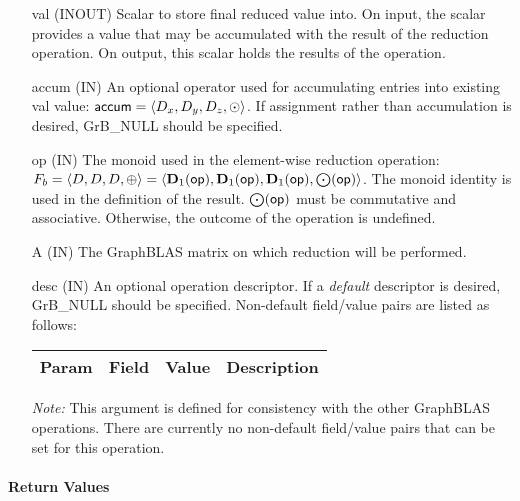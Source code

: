 \begin{itemize}[leftmargin=1.1in]
    \item[{\sf val}]    ({\sf INOUT}) Scalar to store final reduced value into. On input,
    the scalar provides a value that may be accumulated with the result of the
    reduction operation.  On output, this scalar holds the results of the
    operation.

    \item[{\sf accum}]    ({\sf IN}) An optional operator used for accumulating
    entries into existing {\sf val} value: ${\sf accum} = \langle D_x,
    D_y, D_z,\odot \rangle$. If assignment rather than accumulation is
    desired, {\sf GrB\_NULL} should be specified.

    \item[{\sf op}]    ({\sf IN}) The monoid 
    used in the element-wise reduction operation:
    $F_b=\langle D,D,D,\oplus \rangle = \langle \bold{D}_1({\sf op}), \bold{D}_1({\sf op}),
    \bold{D}_1({\sf op}),\bold{\bigodot}({\sf op})\rangle$.
    The monoid identity is used in the definition of the result.
    $\bold{\bigodot}({\sf op})$ must be commutative and associative. Otherwise, the outcome of the operation is undefined.
    
    \item[{\sf A}]     ({\sf IN}) The GraphBLAS matrix on which
	    reduction will be performed.

    \item[{\sf desc}] ({\sf IN}) An optional operation descriptor. If
    a \emph{default} descriptor is desired, {\sf GrB\_NULL} should be
    specified. Non-default field/value pairs are listed as follows:  \\

    \begin{tabular}{lllp{2.5in}}
        Param & Field  & Value & Description \\
        \hline
    \end{tabular}

    \emph{Note:} This argument is defined for consistency with the other GraphBLAS operations.
    There are currently no non-default field/value pairs that can be set for this operation.
\end{itemize}

\paragraph{Return Values}

